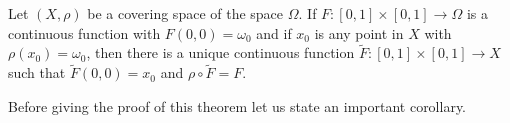 Let $(X, \rho)$ be a covering space of the space $\Omega$. If $F: [0, 1] \times [0, 1] \rightarrow \Omega$ is a continuous function with $F(0, 0) = \omega_0$ and if $x_0$ is any point in $X$ with $\rho(x_0) = \omega_0$, then there is a unique continuous function $\tilde{F}: [0, 1] \times [0, 1] \rightarrow X$ such that $\tilde{F}(0, 0) = x_0$ and $\rho \circ \tilde{F} = F$.

Before giving the proof of this theorem let us state an important corollary.